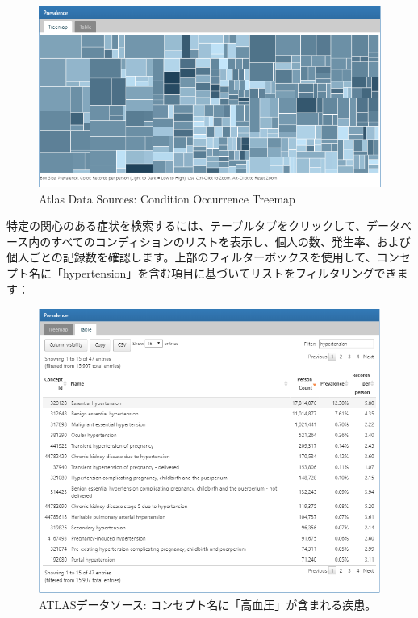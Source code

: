\documentclass[
  11pt]{book}
\theoremstyle{definition}
\theoremstyle{definition}
\theoremstyle{definition}
\theoremstyle{definition}
\theoremstyle{remark}
\begin{document}
\begin{figure}

{\centering \includegraphics[width=1\linewidth]{images/Characterization/atlasDataSourcesConditionTreemap} 

}

\caption{Atlas Data Sources: Condition Occurrence Treemap}\label{fig:atlasDataSourcesConditionTreemap}
\end{figure}

特定の関心のある症状を検索するには、テーブルタブをクリックして、データベース内のすべてのコンディションのリストを表示し、個人の数、発生率、および個人ごとの記録数を確認します。上部のフィルターボックスを使用して、コンセプト名に「hypertension」を含む項目に基づいてリストをフィルタリングできます：

\begin{figure}

{\centering \includegraphics[width=1\linewidth]{images/Characterization/atlasDataSourcesConditionFiltered} 

}

\caption{ATLASデータソース: コンセプト名に「高血圧」が含まれる疾患。}\label{fig:atlasDataSourcesConditionFiltered}
\end{figure}
\end{document}
